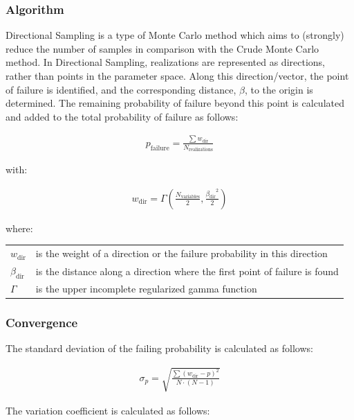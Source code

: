{\subsubsection{Algorithm}
Directional Sampling is a type of Monte Carlo method which aims to (strongly) reduce the number of samples in comparison with the Crude Monte Carlo method. In Directional Sampling, realizations are represented as directions, rather than points in the parameter space. Along this direction/vector, the point of failure is identified, and the corresponding distance, $\beta$, to the origin is determined. The remaining probability of failure beyond this point is calculated and added to the total probability of failure as follows:

\begin{align} 
\label{eq:DirectionalSampling}
p_{\text{failure}} = \frac{\sum w_{\text{dir}}}{N_{\text{realizations}}}
\end{align}

with:

\begin{align} 
\label{eq:DirectionalSamplingWeight}
w_{\text{dir}} = \Gamma \left(\frac{N_{\text{variables}}}{2} , \frac{{\beta_{\text{dir}}}^2}{2} \right)
\end{align}

where:

\begin{longtable}{p{16mm}p{\textwidth-24pt-16mm}}  
	$w_{\text{dir}}$ & is the weight of a direction or the failure probability in this direction \\
	$\beta_{\text{dir}}$ & is the distance along a direction where the first point of failure is found \\
	$\Gamma$ & is the upper incomplete regularized gamma function
\end{longtable}

\subsubsection{Convergence}

The standard deviation of the failing probability is calculated as follows:

\begin{align} 
\label{eq:DirectionalSamplingStandardDeviation}
\sigma_p = \sqrt{\frac{\sum \left(w_{\text{dir}} - p \right)^2}{N \cdot \left(N - 1\right)}}
\end{align}

The variation coefficient is calculated as follows:

}
